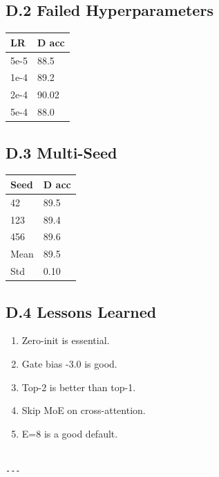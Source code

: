 \subsection{D.2 Failed Hyperparameters}

\begin{table}[H]
\centering
\small
\begin{tabular}{ll}
\toprule
\textbf{LR} & \textbf{D acc} \\
\midrule
5e-5 & 88.5 \\
1e-4 & 89.2 \\
2e-4 & 90.02 \\
5e-4 & 88.0 \\
\bottomrule
\end{tabular}
\end{table}

\subsection{D.3 Multi-Seed}

\begin{table}[H]
\centering
\small
\begin{tabular}{ll}
\toprule
\textbf{Seed} & \textbf{D acc} \\
\midrule
42 & 89.5 \\
123 & 89.4 \\
456 & 89.6 \\
Mean & 89.5 \\
Std & 0.10 \\
\bottomrule
\end{tabular}
\end{table}

\subsection{D.4 Lessons Learned}

\begin{enumerate}
\item Zero-init is essential.
\item Gate bias -3.0 is good.
\item Top-2 is better than top-1.
\item Skip MoE on cross-attention.
\item E=8 is a good default.
\end{enumerate}
\begin{lstlisting}

---
\end{lstlisting}